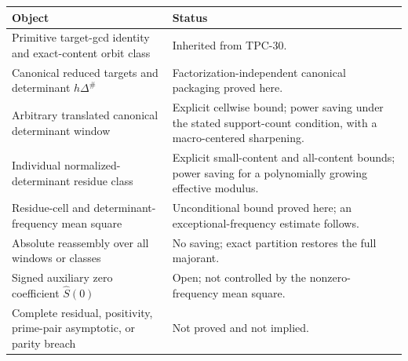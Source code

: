 \begin{center}
\begin{tabular}{>{\raggedright\arraybackslash}p{}
                >{\raggedright\arraybackslash}p{}}
\toprule
Object & Status \\
\midrule
Primitive target-gcd identity and exact-content orbit class
& Inherited from TPC-30. \\
\addlinespace
Canonical reduced targets and determinant $h\Delta^\#$
& Factorization-independent canonical packaging proved here. \\
\addlinespace
Arbitrary translated canonical determinant window
& Explicit cellwise bound; power saving under the stated support-count
condition, with a macro-centered sharpening. \\
\addlinespace
Individual normalized-determinant residue class
& Explicit small-content and all-content bounds; power saving for a
polynomially growing effective modulus. \\
\addlinespace
Residue-cell and determinant-frequency mean square
& Unconditional bound proved here; an exceptional-frequency estimate follows. \\
\addlinespace
Absolute reassembly over all windows or classes
& No saving; exact partition restores the full majorant. \\
\addlinespace
Signed auxiliary zero coefficient $\widehat S(0)$
& Open; not controlled by the nonzero-frequency mean square. \\
\addlinespace
Complete residual, positivity, prime-pair asymptotic, or parity breach
& Not proved and not implied. \\
\bottomrule
\end{tabular}
\end{center}
